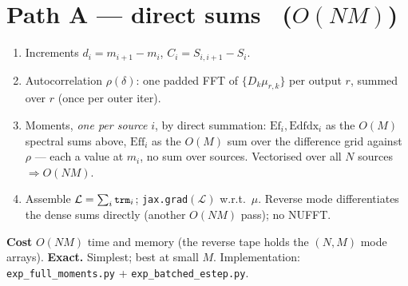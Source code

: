 \documentclass[11pt]{article}
\newcommand{\code}[1]{\texttt{\small #1}}
\begin{document}
\section{Path A --- direct sums \ ($O(NM)$)}
\begin{enumerate}[leftmargin=1.6em,itemsep=2pt]
\item Increments $d_i=m_{i+1}-m_i$, $C_i=S_{i,i+1}-S_i$.
\item Autocorrelation $\rho(\delta)$: one padded FFT of $\{D_k\mu_{r,k}\}$
  per output $r$, summed over $r$ (once per outer iter).
\item Moments, \emph{one per source} $i$, by direct summation:
  $\mathrm{Ef}_i,\mathrm{Edfdx}_i$ as the $O(M)$ spectral sums above,
  $\mathrm{Eff}_i$ as the $O(M)$ sum over the difference grid against
  $\rho$ --- each a value at $m_i$, no sum over sources. Vectorised over
  all $N$ sources $\Rightarrow O(NM)$.
\item Assemble $\mathcal L=\sum_i\code{trm}_i$; \code{jax.grad}$(\mathcal L)$
  w.r.t.\ $\mu$. Reverse mode differentiates the dense sums directly
  (another $O(NM)$ pass); no NUFFT.
\end{enumerate}
\textbf{Cost} $O(NM)$ time and memory (the reverse tape holds the
$(N,M)$ mode arrays). \textbf{Exact.} Simplest; best at small $M$.
Implementation: \code{exp\_full\_moments.py} + \code{exp\_batched\_estep.py}.

\end{document}
